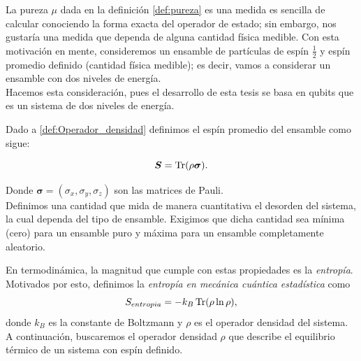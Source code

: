 \documentclass[../Main.tex]{subfiles}
\begin{document}
La pureza $\mu$ dada en la definición \eqref{def:pureza} es una medida es sencilla de calcular conociendo la forma exacta del operador de estado; sin embargo, nos gustaría una medida que dependa de alguna cantidad física medible. Con esta motivación en mente, consideremos un ensamble de partículas de espín $\frac{1}{2}$ y espín promedio definido (cantidad física medible); es decir, vamos a considerar un ensamble con dos niveles de energía.\\ Hacemos esta consideración, pues el desarrollo de esta tesis se basa en qubits que es un sistema de dos niveles de energía.

Dado a \eqref{def:Operador_densidad} definimos el espín promedio del ensamble como sigue:


\begin{equation}
    \bm{S}=\Tr(\rho \bm{\sigma}).
\end{equation}


Donde $\bm{\sigma}=(\sigma_x,\sigma_y,\sigma_z)$ son las matrices de Pauli.\\ 

Definimos una cantidad que mida de manera cuantitativa el desorden del sistema, la cual dependa del tipo de ensamble. Exigimos que dicha cantidad sea mínima (cero) para un ensamble puro y máxima para un ensamble completamente aleatorio.  

En termodinámica, la magnitud que cumple con estas propiedades es la \textit{entropía}. Motivados por esto, definimos la \textit{entropía en mecánica cuántica estadística} como \cite{Sakurai2011}
\begin{equation}
    S_{entropia} = -k_B \Tr(\rho \ln \rho),
    \label{def:entropia}
\end{equation}
donde $k_B$ es la constante de Boltzmann y $\rho$ es el operador densidad del sistema.\\
A continuación, buscaremos el operador densidad $\rho$ que describe el equilibrio térmico de un sistema con espín definido.
\end{document}
